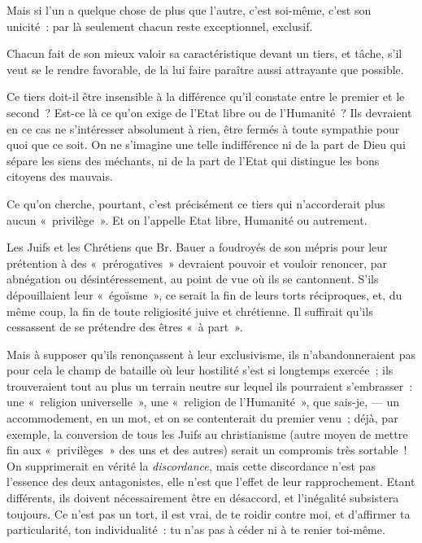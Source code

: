 \documentclass[french,twoside]{book} %
\begin{document}
Mais si l’un a quelque chose de plus que l’autre, c’est soi-même, c’est son unicité : par là seulement chacun reste exceptionnel, exclusif.\par
Chacun fait de son mieux valoir sa caractéristique devant un tiers, et tâche, s’il veut se le rendre favorable, de la lui faire paraître aussi attrayante que possible.\par
Ce tiers doit-il être insensible à la différence qu’il  constate entre le premier et le second ? Est-ce là ce qu’on exige de l’Etat libre ou de l’Humanité ? Ils devraient en ce cas ne s’intéresser absolument à rien, être fermés à toute sympathie pour quoi que ce soit. On ne s’imagine une telle indifférence ni de la part de Dieu qui sépare les siens des méchants, ni de la part de l’Etat qui distingue les bons citoyens des mauvais.\par
Ce qu’on cherche, pourtant, c’est précisément ce tiers qui n’accorderait plus aucun « privilège ». Et on l’appelle Etat libre, Humanité ou autrement.\par
Les Juifs et les Chrétiens que Br. Bauer a foudroyés de son mépris pour leur prétention à des « prérogatives » devraient pouvoir et vouloir renoncer, par abnégation ou désintéressement, au point de vue où ils se cantonnent. S’ils dépouillaient leur « égoïsme », ce serait la fin de leurs torts réciproques, et, du même coup, la fin de toute religiosité juive et chrétienne. Il suffirait qu’ils cessassent de se prétendre des êtres « à part ».\par
Mais à supposer qu’ils renonçassent à leur exclusivisme, ils n’abandonneraient pas pour cela le champ de bataille où leur hostilité s’est si longtemps exercée ; ils trouveraient tout au plus un terrain neutre sur lequel ils pourraient s’embrasser : une « religion universelle », une « religion de l’Humanité », que sais-je, — un accommodement, en un mot, et on se contenterait du premier venu ; déjà, par exemple, la conversion de tous les Juifs au christianisme (autre moyen de mettre fin aux « privilèges » des uns et des autres) serait un compromis très sortable ! On supprimerait en vérité la \emph{discordance,} mais cette discordance n’est pas l’essence des deux antagonistes, elle n’est que l’effet de leur rapprochement. Etant différents, ils doivent nécessairement être en désaccord, et l’inégalité subsistera toujours. Ce n’est pas un tort, il est vrai, de te roidir contre moi, et d’affirmer ta particularité, ton individualité :  tu n’as pas à céder ni à te renier toi-même.\par
\end{document}
